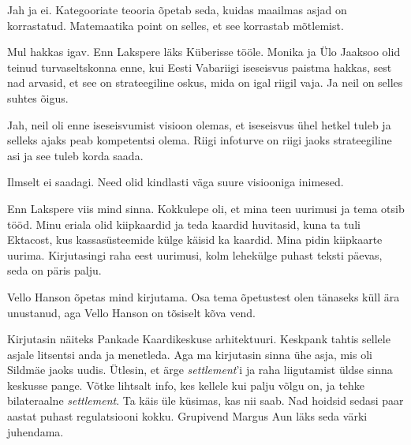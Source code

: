 
Jah ja ei. Kategooriate teooria õpetab seda, kuidas maailmas 
asjad on korrastatud. Matemaatika point on selles, et see korrastab 
mõtlemist.


Mul hakkas igav. Enn Lakspere
läks Küberisse tööle. Monika ja Ülo Jaaksoo olid 
teinud turvaseltskonna enne, kui Eesti Vabariigi iseseisvus paistma 
hakkas, sest nad arvasid, et see on strateegiline oskus, mida on igal riigil 
vaja. Ja neil on selles suhtes õigus.


Jah, neil oli enne iseseisvumist visioon olemas, et iseseisvus 
ühel hetkel tuleb ja selleks ajaks peab kompetentsi olema. Riigi 
infoturve on riigi jaoks strateegiline asi ja see tuleb korda saada.


Ilmselt ei saadagi. Need olid kindlasti väga suure visiooniga inimesed. 


Enn Lakspere viis mind sinna. Kokkulepe oli, et mina teen uurimusi ja tema otsib 
tööd. Minu eriala olid kiipkaardid ja teda kaardid huvitasid, kuna ta tuli 
Ektacost, kus kassasüsteemide külge käisid ka kaardid. Mina pidin kiipkaarte 
uurima. Kirjutasingi raha eest uurimusi, kolm lehekülge puhast teksti 
päevas, seda on päris palju.

Vello Hanson õpetas mind kirjutama. Osa tema 
õpetustest olen tänaseks küll ära unustanud, aga Vello Hanson on tõsiselt kõva 
vend. 

Kirjutasin näiteks Pankade Kaardikeskuse arhitektuuri. Keskpank tahtis sellele asjale litsentsi anda ja 
menetleda. Aga ma kirjutasin sinna ühe asja, mis oli 
Sildmäe jaoks uudis. Ütlesin, et ärge \emph{settlement}'i ja 
raha liigutamist üldse sinna 
keskusse pange. Võtke lihtsalt info, kes kellele kui palju võlgu on, ja tehke 
bilateraalne \emph{settlement}. Ta käis üle küsimas, 
kas nii saab. Nad hoidsid sedasi paar aastat 
puhast regulatsiooni kokku. Grupivend Margus Aun 
läks seda värki juhendama. 

